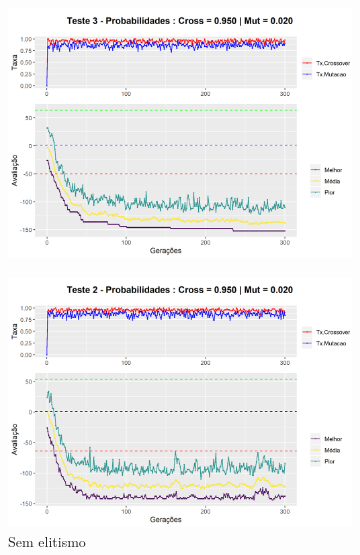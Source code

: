 \begin{figure}[h!]
\begin{subfigure}[b]{0.47\linewidth}
		\caption{}
	\end{subfigure}
	\begin{subfigure}[b]{0.47\linewidth}
		\includegraphics[width=\linewidth]{imagens/graph_pc_0_950_pm_0_020_pop_50_g_300__3.png}
		\caption{}
	\end{subfigure}
	\begin{subfigure}[b]{0.47\linewidth}
		\includegraphics[width=\linewidth]{imagens/graph_pc_0_950_pm_0_020_pop_50_g_300__2_noelite.png}
		\caption{Sem elitismo}
	\end{subfigure}
	\begin{subfigure}[b]{0.47\linewidth}

\end{subfigure}
\end{figure}
